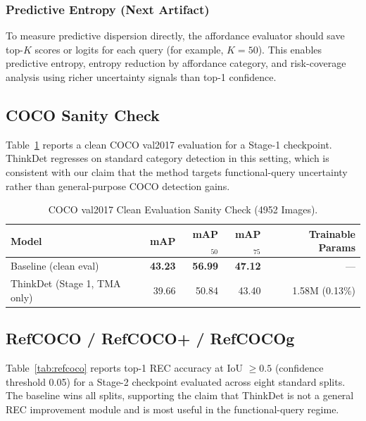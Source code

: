 \documentclass{uai2026} %
\begin{document}
\subsubsection{Predictive Entropy (Next Artifact)}
To measure predictive dispersion directly, the affordance evaluator should save top-\(K\) scores or logits for each query (for example, \(K=50\)). This enables predictive entropy, entropy reduction by affordance category, and risk-coverage analysis using richer uncertainty signals than top-1 confidence.

\subsection{COCO Sanity Check}
Table~\ref{tab:coco} reports a clean COCO val2017 evaluation for a Stage-1 checkpoint. ThinkDet regresses on standard category detection in this setting, which is consistent with our claim that the method targets functional-query uncertainty rather than general-purpose COCO detection gains.

\begin{table}[t]
\centering
\caption{COCO val2017 Clean Evaluation Sanity Check (4952 Images).}
\label{tab:coco}
\begin{tabular}{lrrrr}
\toprule
Model & mAP & mAP\(_{50}\) & mAP\(_{75}\) & Trainable Params \\
\midrule
Baseline (clean eval) & \textbf{43.23} & \textbf{56.99} & \textbf{47.12} & --- \\
ThinkDet (Stage 1, TMA only) & 39.66 & 50.84 & 43.40 & 1.58M (0.13\%) \\
\bottomrule
\end{tabular}
\end{table}

\subsection{RefCOCO / RefCOCO+ / RefCOCOg}
Table~\ref{tab:refcoco} reports top-1 REC accuracy at IoU \(\geq 0.5\) (confidence threshold 0.05) for a Stage-2 checkpoint evaluated across eight standard splits. The baseline wins all splits, supporting the claim that ThinkDet is not a general REC improvement module and is most useful in the functional-query regime.
\end{document}
